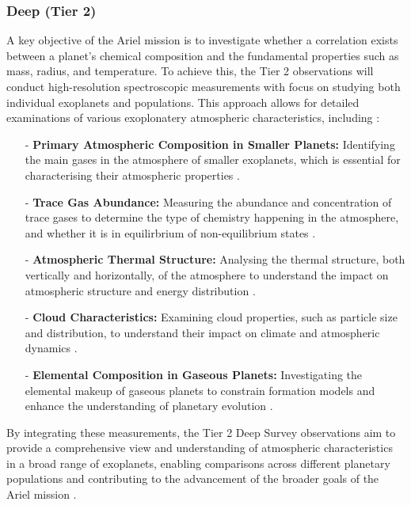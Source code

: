 \documentclass[12pt]{article}
\begin{document}
\subsubsection{Deep (Tier 2)}

A key objective of the Ariel mission is to investigate whether a correlation exists between a planet's chemical composition and the fundamental properties such as mass, radius, and temperature. To achieve this, the Tier 2 observations will conduct high-resolution spectroscopic measurements with focus on studying both individual
exoplanets and populations. This approach allows for detailed examinations of various exoplonatery atmospheric characteristics, including \cite{salvignol2024ariel}:

\begin{itemize}
    \item[-] \textbf{Primary Atmospheric Composition in Smaller Planets:} Identifying the main gases in the atmosphere of smaller exoplanets, which is essential for characterising their atmospheric properties \cite{salvignol2024ariel}.
    \item[-] \textbf{Trace Gas Abundance:} Measuring the abundance and concentration of trace gases to determine the type of chemistry happening in the atmosphere, and whether it is in equilirbrium of non-equilibrium states \cite{salvignol2024ariel}.
    \item[-] \textbf{Atmospheric Thermal Structure:} Analysing the thermal structure, both vertically and horizontally, of the atmosphere to understand the impact on atmospheric structure and energy distribution \cite{salvignol2024ariel}.
    \item[-] \textbf{Cloud Characteristics:} Examining cloud properties, such as particle size and distribution, to understand their impact on climate and atmospheric dynamics \cite{salvignol2024ariel}.
    \item[-] \textbf{Elemental Composition in Gaseous Planets:} Investigating the elemental makeup of gaseous planets to constrain formation models and enhance the understanding of planetary evolution \cite{salvignol2024ariel}.
\end{itemize}

By integrating these measurements, the Tier 2 Deep Survey observations aim to provide a comprehensive view and understanding of atmospheric characteristics in a broad range of exoplanets, enabling comparisons across different planetary populations and contributing to the advancement of the broader goals of the Ariel mission \cite{salvignol2024ariel}.
\end{document}
